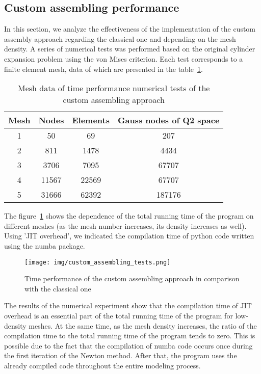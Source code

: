 \documentclass[12pt]{article}
\begin{document}
\subsection{Custom assembling performance}

In this section, we analyze the effectiveness of the implementation of the custom assembly approach regarding the classical one and depending on the mesh density. A series of numerical tests was performed based on the original cylinder expansion problem using the von Mises criterion. Each test corresponds to a finite element mesh, data of which are presented in the table~\ref{tab:custom_assembling_tests}. 

\begin{table}[H]
	\centering
	\begin{tabular}{|cccc|}
		\hline
		Mesh & Nodes & Elements & Gauss nodes of Q2 space \\
		\hline
		1 & 50	& 69 & 207 \\
		2 & 811 & 1478 & 4434 \\
		3 & 3706 & 7095 & 67707 \\
		4 & 11567 & 22569 & 67707 \\
		5 & 31666 & 62392 & 187176 \\
		\hline
	\end{tabular}
	\caption{Mesh data of time performance numerical tests of the custom assembling approach}
    \label{tab:custom_assembling_tests}
\end{table}

The figure~\ref{fig:custom_assembling_analysis} shows the dependence of the total running time of the program on different meshes (as the mesh number increases, its density increases as well). Using 'JIT overhead', we indicated the compilation time of python code written using the numba package.

\begin{figure}[H]
    \center
    \texttt{[image: img/custom\_assembling\_tests.png]}
    \caption{Time performance of the custom assembling approach in comparison with the classical one}
    \label{fig:custom_assembling_analysis}
\end{figure}

The results of the numerical experiment show that the compilation time of JIT overhead is an essential part of the total running time of the program for low-density meshes. At the same time, as the mesh density increases, the ratio of the compilation time to the total running time of the program tends to zero. This is possible due to the fact that the compilation of numba code occurs once during the first iteration of the Newton method. After that, the program uses the already compiled code throughout the entire modeling process.
\end{document}
